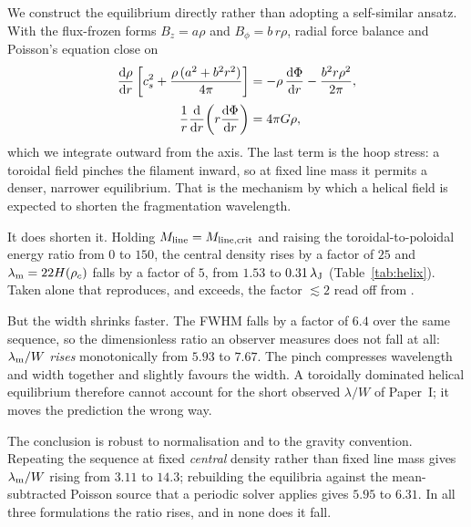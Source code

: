 \documentclass[usenatbib,twoside,twocolumn]{mnras}
\begin{document}
We construct the equilibrium directly rather than adopting a self-similar ansatz. With the flux-frozen forms $B_z=a\rho$ and $B_\phi=b\,r\rho$, radial force balance and Poisson's equation close on
\begin{equation}
\begin{aligned}
\frac{{\rm d}\rho}{{\rm d}r}\left[c_s^2+\frac{\rho\,(a^2+b^2r^2)}{4\pi}\right]
 &= -\rho\,\frac{{\rm d}\Phi}{{\rm d}r}-\frac{b^2r\rho^2}{2\pi},\\[2pt]
\frac{1}{r}\frac{{\rm d}}{{\rm d}r}\!\left(r\frac{{\rm d}\Phi}{{\rm d}r}\right) &= 4\pi G\rho ,
\end{aligned}
\label{eq:helix}
\end{equation}
which we integrate outward from the axis. The last term is the hoop stress: a toroidal field pinches the filament inward, so at fixed line mass it permits a denser, narrower equilibrium. That is the mechanism by which a helical field is expected to shorten the fragmentation wavelength.

It does shorten it. Holding $M_{\rm line}=M_{\rm line,crit}$ and raising the toroidal-to-poloidal energy ratio from $0$ to $150$, the central density rises by a factor of $25$ and $\lambda_{\rm m}=22H(\rho_c)$ falls by a factor of $5$, from $1.53$ to $0.31\,\lambda_{\rm J}$ (Table~\ref{tab:helix}). Taken alone that reproduces, and exceeds, the factor $\lesssim2$ read off from \citet{Fiege2000}.

But the width shrinks faster. The FWHM falls by a factor of $6.4$ over the same sequence, so the dimensionless ratio an observer measures does not fall at all: $\lambda_{\rm m}/W$ \emph{rises} monotonically from $5.93$ to $7.67$. The pinch compresses wavelength and width together and slightly favours the width. A toroidally dominated helical equilibrium therefore cannot account for the short observed $\lambda/W$ of Paper~I; it moves the prediction the wrong way.

The conclusion is robust to normalisation and to the gravity convention. Repeating the sequence at fixed \emph{central} density rather than fixed line mass gives $\lambda_{\rm m}/W$ rising from $3.11$ to $14.3$; rebuilding the equilibria against the mean-subtracted Poisson source that a periodic solver applies gives $5.95$ to $6.31$. In all three formulations the ratio rises, and in none does it fall.
\end{document}
